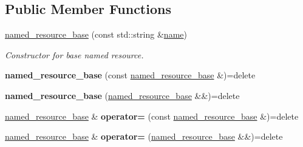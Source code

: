 \subsection*{Public Member Functions}
\begin{DoxyCompactItemize}
\item 
\hyperlink{classcpen333_1_1process_1_1impl_1_1named__resource__base_a5f6f8b6daec88189a041de4c60ad4518}{named\+\_\+resource\+\_\+base} (const std\+::string \&\hyperlink{classcpen333_1_1process_1_1impl_1_1named__resource__base_ae0c5fbb1843afe863cece4b51c38f807}{name})
\begin{DoxyCompactList}\small\item\em Constructor for base named resource. \end{DoxyCompactList}\item 
\mbox{\label{classcpen333_1_1process_1_1impl_1_1named__resource__base_ac0a5865c57b4aefaccc245cc085ca7f3}} 
{\bfseries named\+\_\+resource\+\_\+base} (const \hyperlink{classcpen333_1_1process_1_1impl_1_1named__resource__base}{named\+\_\+resource\+\_\+base} \&)=delete
\item 
\mbox{\label{classcpen333_1_1process_1_1impl_1_1named__resource__base_a796cb7d29c742f5acc1361ed59493c26}} 
{\bfseries named\+\_\+resource\+\_\+base} (\hyperlink{classcpen333_1_1process_1_1impl_1_1named__resource__base}{named\+\_\+resource\+\_\+base} \&\&)=delete
\item 
\mbox{\label{classcpen333_1_1process_1_1impl_1_1named__resource__base_a1a72075d25def1f1975c434b2573bcf5}} 
\hyperlink{classcpen333_1_1process_1_1impl_1_1named__resource__base}{named\+\_\+resource\+\_\+base} \& {\bfseries operator=} (const \hyperlink{classcpen333_1_1process_1_1impl_1_1named__resource__base}{named\+\_\+resource\+\_\+base} \&)=delete
\item 
\mbox{\label{classcpen333_1_1process_1_1impl_1_1named__resource__base_a78156ecc765594b7d17029e69c6b7909}} 
\hyperlink{classcpen333_1_1process_1_1impl_1_1named__resource__base}{named\+\_\+resource\+\_\+base} \& {\bfseries operator=} (\hyperlink{classcpen333_1_1process_1_1impl_1_1named__resource__base}{named\+\_\+resource\+\_\+base} \&\&)=delete

\end{DoxyCompactItemize}
